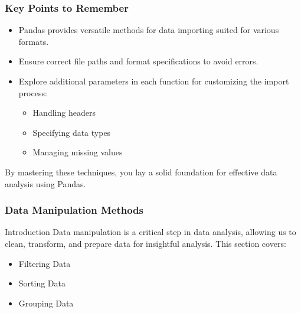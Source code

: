 \documentclass{beamer}
\begin{document}
\begin{frame}
    \frametitle{Key Points to Remember}
    \begin{itemize}
        \item Pandas provides versatile methods for data importing suited for various formats.
        \item Ensure correct file paths and format specifications to avoid errors.
        \item Explore additional parameters in each function for customizing the import process:
        \begin{itemize}
            \item Handling headers
            \item Specifying data types
            \item Managing missing values
        \end{itemize}
    \end{itemize}
    By mastering these techniques, you lay a solid foundation for effective data analysis using Pandas.
\end{frame}

\begin{frame}[fragile]
    \frametitle{Data Manipulation Methods}
    \begin{block}{Introduction}
        Data manipulation is a critical step in data analysis, allowing us to clean, transform, and prepare data for insightful analysis. This section covers:
        \begin{itemize}
            \item Filtering Data
            \item Sorting Data
            \item Grouping Data
        \end{itemize}
    \end{block}
\end{frame}
\end{document}
